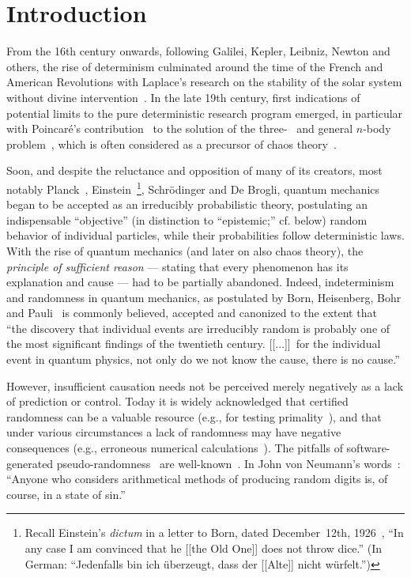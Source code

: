 \documentclass[%
 preprint,
 showpacs,
 showkeys,
 preprintnumbers,
 amsmath,amssymb,
 aps,
 prl,
  longbibliography,
 ]{revtex4-1}
\begin{document}
\section{Introduction}
\thispagestyle{empty}

From the 16th century onwards, following Galilei, Kepler, Leibniz, Newton and others,
the rise of determinism culminated around the time of the French and American Revolutions
with Laplace's research on the stability of the solar system without divine intervention~\cite{frank}.
In the late 19th century, first indications of potential limits to
the pure deterministic research program emerged, in particular with Poincar{\'{e}}'s contribution~\cite{poincare14,Diacu96} to the
solution of the three-~\cite{Sundman12} and general $n$-body problem~\cite{Wang91,Wang01,Diacu96},
which is often considered as a precursor of chaos theory~\cite{eckmann1,Diacu96-ce}.

Soon, and despite the reluctance and opposition of many of its creators,
most notably Planck~\cite{born-55}, Einstein~\footnote{
Recall Einstein's {\it dictum} in a letter to Born, dated December~12th, 1926~\cite[p.~113]{born-69},
``In any case I am convinced that he [[the Old One]] does not throw dice.''
(In German: ``Jedenfalls bin ich {\"{u}}berzeugt, dass der [[Alte]] nicht w{\"{u}}rfelt.'')},
Schr\"odinger and De Brogli,
quantum mechanics began to be accepted as an irreducibly probabilistic theory,
postulating an indispensable ``objective'' (in distinction to ``epistemic;'' cf. below) random behavior of individual particles,
while their probabilities follow deterministic laws.
With the rise of quantum mechanics (and later on also chaos theory), the {\em principle of sufficient reason}
--- stating that every phenomenon has its explanation and cause ---
had to be partially abandoned.
Indeed,  indeterminism and randomness in quantum mechanics,
as postulated by Born, Heisenberg, Bohr and Pauli~\cite[p.~115]{pauli-probaphysics}
is commonly believed, accepted and canonized to the extent  that~\cite{zeil-05_nature_ofQuantum}
``the discovery that individual events are
irreducibly random is probably one of the
most significant findings of the twentieth
century. [[$\ldots$]]~for the individual event in quantum physics, not only do we not know the cause, there is no cause.''


However, insufficient causation needs not be perceived merely negatively as a lack of prediction or control.
Today it is widely acknowledged that certified randomness can be a valuable resource
(e.g., for testing primality~\cite{ch-schw-78,Granville-92}), and that under various circumstances
a lack of randomness may have negative consequences (e.g., erroneous numerical calculations~\cite{PhysRevE.69.055702}).
The pitfalls of software-generated pseudo-randomness~\cite{v-neumann-50}
are well-known~\cite{Marsaglia-68,DBLP:journals/ibmrd/Pickover91,Bowman1995315,PhysRevE.69.055702}.
In John von Neumann's words~\cite{von-neumann1}:
``Anyone who considers arithmetical methods of producing random digits is, of course, in a state of sin.''
\end{document}
